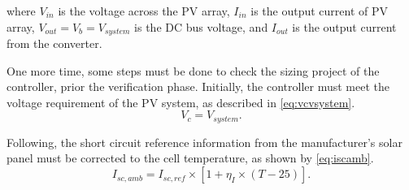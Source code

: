 \documentclass[journal]{IEEEtran}
\begin{document}
\noindent where $ V_{in} $ is the voltage across the PV array, $ I_{in} $ is the output current of PV array, $ V_{out}=V_{b}=V_{system} $ is the  DC bus voltage, and $ I_{out} $ is the output current from the converter.

% 
%
%
%
% 
%  
% 
 
One more time, some steps must be done to check the sizing project of the controller, prior the verification phase. Initially, the controller must meet the voltage requirement of the PV system, as described in \eqref{eq:vcvsystem}. 
\begin{equation}
\label{eq:vcvsystem}
V_{c} = V_{system}.
\end{equation}

Following, the short circuit reference information from the manufacturer's solar panel must be corrected to the cell temperature, as shown by \eqref{eq:iscamb}.
\begin{equation}
\label{eq:iscamb}
I_{sc,amb} = I_{sc,ref} \times \left[ 1 + \eta_{I} \times (T-25) \right]. 
\end{equation}
\end{document}
